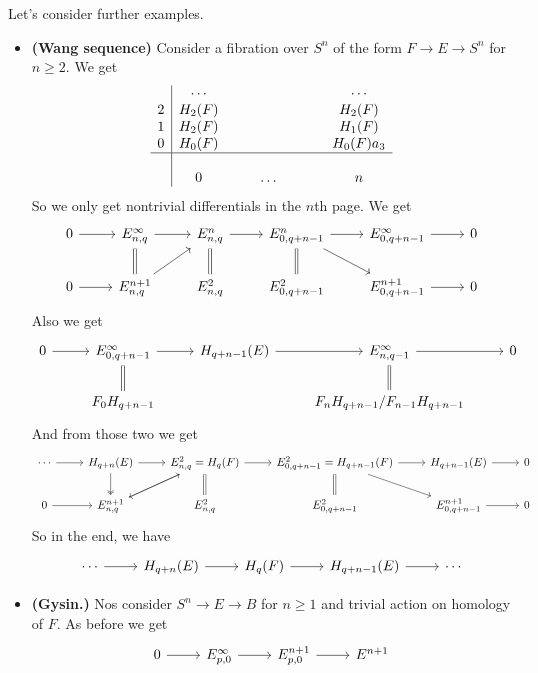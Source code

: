 \documentclass{article}
\begin{document}
Let's consider further examples.
\begin{examples}\leavevmode
	\begin{itemize}
		\item \textbf{(Wang sequence)} Consider a fibration over $S^n$ of the form $F\to E\to S^n$ for $n\geq2$. We get
			\begin{align*}
			\begin{array}{c|cccccccc}
				&\cdots&&&&&&&\cdots\\
				2&H_2(F)&&&&&&&H_2(F)\\
				1&H_2(F)&&&&&&&H_1(F)\\
				0&H_0(F)&&&&&&&H_0(F) a_3\\
				\hline\\
				&0&&&\ldots&&&&n
			\end{array}
		\end{align*}
		So we only get nontrivial differentials in the $n$th page. We get
		\begin{equation}
			\begin{tikzcd}
			0\arrow[r]&E^\infty_{n,q}\arrow[d,equal]\arrow[r]&E^n_{n,q}\arrow[r]&E^n_{0,q+n-1}\arrow[r]\arrow[dr]&E^\infty_{0,q+n-1}\arrow[r]&0\\
			0\arrow[r]&E^{n+1}_{n,q}\arrow[ur]&E^2_{n,q}\arrow[u,equal]&E^{2}_{0,q+n-1}\arrow[u,equal]&E^{n+1}_{0,q+n-1}\arrow[r]&0
		\end{tikzcd}
		\end{equation}
		Also we get
		\begin{equation}
			\begin{tikzcd}
				0\arrow[r]&E^\infty_{0,q+n-1}\arrow[d,equal]\arrow[r]&H_{q+n-1}(E)\arrow[r]&E^\infty_{n,q-1}\arrow[r]\arrow[d,equal]&0\\
				&F_0H_{q+n-1}&&F_nH_{q+n-1}/F_{n-1}H_{q+n-1}
			\end{tikzcd}
		\end{equation}
		And from those two we get
			\begin{equation}
			\begin{tikzcd}
				\cdots\arrow[r]&H_{q+n}(E)\arrow[d,two heads]\arrow[r]&E^2_{n,q}=H_q(F)\arrow[dl]\arrow[r]&E^2_{0,q+n-1}=H_{q+n-1}(F)\arrow[r]\arrow[dr]&H_{q+n-1}(E)\arrow[r]&0\\
				0\arrow[r]&E^{n+1}_{n,q}\arrow[ur]&E^2_{n,q}\arrow[u,equal]&E^{2}_{0,q+n-1}\arrow[u,equal]&E^{n+1}_{0,q+n-1}\arrow[r]&0
			\end{tikzcd}
		\end{equation}
		So in the end, we have
		\[\begin{tikzcd}
			\cdots\arrow[r]&H_{q+n}(E)\arrow[r]&H_q(F)\arrow[r]&H_{q+n-1}(E)\arrow[r]&\cdots
		\end{tikzcd}\]
		\item \textbf{(Gysin.)} Nos consider $S^n\to E\to B$ for $n\geq 1$ and trivial action on homology of $F$. As before we get
		\[\begin{tikzcd}
			0\arrow[r]&E^\infty_{p,0}\arrow[r]&E^{n+1}_{p,0}\arrow[r]&E^{n+1}
		\end{tikzcd}\]
	\end{itemize}
\end{examples}
\end{document}

